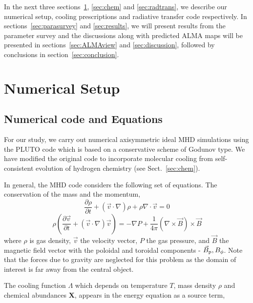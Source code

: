 \documentclass[useAMS,usenatbib]{mn2e}
\begin{document}
In the next three sections~\ref{sec:numsetup}, \ref{sec:chem} and
\ref{sec:radtrans}, we describe our numerical setup, cooling
prescriptions and radiative transfer code respectively. In
sections~\ref{sec:parasurvey} and \ref{sec:results}, we will present results from the parameter survey and the
discussions along with predicted ALMA maps will be presented in
sections~\ref{sec:ALMAview} and \ref{sec:discussion}, followed by
conclusions in section~\ref{sec:conclusion}.

\section{Numerical Setup}
\label{sec:numsetup}
\subsection{Numerical code and Equations}
For our study, we carry out numerical axisymmetric ideal MHD simulations using the PLUTO code \citep{Mignone:2007p644} which is based on a conservative scheme of Godunov type.
We have modified the original code to incorporate molecular cooling
from self-consistent evolution of hydrogen chemistry (see Sect.~\ref{sec:chem}).

  
In general, the MHD code considers the following set of equations.
The conservation of the mass and the momentum,
%
\begin{equation}\label{masscons}
\frac{\partial \rho}{\partial t} + (\vec{v} \cdot \nabla)\rho  +
\rho \nabla \cdot \vec{v} = 0
\end{equation}
%
\begin{equation}\label{momcons}
\rho(\frac{\partial \vec{v}}{\partial t} +
(\vec{v} \cdot \nabla) \vec{v}) =
- \nabla P + \frac{1}{4\pi} (\nabla \times \vec{B}) \times \vec{B}
\end{equation}
%
where $\rho$ is gas density, $\vec{v}$ the velocity vector, $P$ the gas pressure,
and $\vec{B}$ the magnetic field vector with the poloidal and toroidal
components - $\vec{B}_{\rm p}, {B}_{\phi}$. Note that the forces due
to gravity are neglected for this problem as the domain of interest is
far away from the central object.  
%

The cooling function $\Lambda$ which depends on temperature $T$, mass density $\rho$ and
chemical abundances {\bf{X}}, appears in the
energy equation as a source term,
\end{document}
